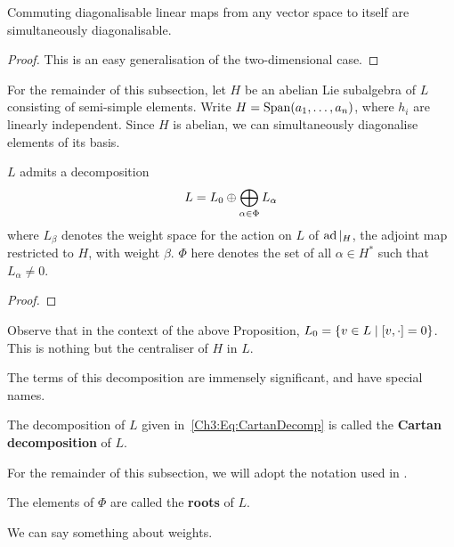 \begin{lemma}
    Commuting diagonalisable linear maps from any vector space to itself are simultaneously diagonalisable.
\end{lemma}
\begin{proof}
    This is an easy generalisation of the two-dimensional case. \sorry %
\end{proof}

For the remainder of this subsection, let $H$ be an abelian Lie subalgebra of $L$ consisting of semi-simple elements. Write $H = \operatorname{Span}\!\left( a_1, \ldots, a_n \right)$, where $h_i$ are linearly independent. Since $H$ is abelian, we can simultaneously diagonalise elements of its basis.

\begin{boxproposition}\label{Ch3:Prop:CartanDecompExists}
    $L$ admits a decomposition
    \begin{align}
        L = L_0 \oplus \bigoplus_{\alpha \in \Phi} L_{\alpha}
        \label{Ch3:Eq:CartanDecomp}
    \end{align}
    where $L_\beta$ denotes the weight space for the action on $L$ of $\operatorname{ad}\vert_{H}$, the adjoint map restricted to $H$, with weight $\beta$. $\Phi$ here denotes the set of all $\alpha \in H^*$ such that $L_{\alpha} \neq 0$.
\end{boxproposition}
\begin{proof}
    \sorry
\end{proof}

Observe that in the context of the above Proposition, $L_0 = \left\{ v \in L \; \middle\vert \; \left[ v, \cdot \right] = 0 \right\}$. This is nothing but the centraliser of $H$ in $L$.

The terms of this decomposition are immensely significant, and have special names.

\begin{boxdefinition}
    The decomposition of $L$ given in~\eqref{Ch3:Eq:CartanDecomp} is called the \textbf{Cartan decomposition} of $L$.
\end{boxdefinition}

For the remainder of this subsection, we will adopt the notation used in .

\begin{boxdefinition}[Roots]
    The elements of $\Phi$ are called the \textbf{roots} of $L$.
\end{boxdefinition}

We can say something about weights.


